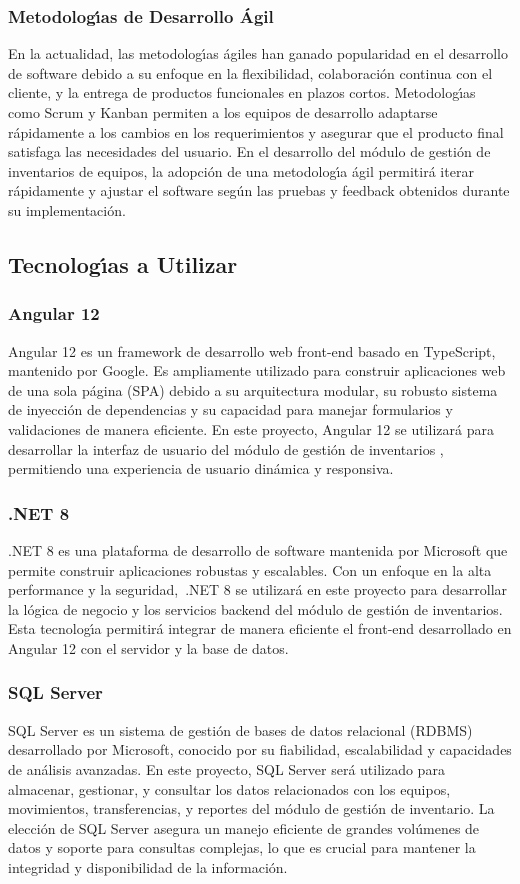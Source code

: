 \documentclass[stu, 12pt, letterpaper, donotrepeattitle, floatsintext, natbib]{apa7}
\begin{document}
\subsubsection{Metodolog\'{\i}as de Desarrollo \'Agil}
En la actualidad, las metodolog\'{\i}as \'agiles han ganado popularidad en el desarrollo de software debido a su enfoque en la flexibilidad, colaboraci\'on continua con el cliente, y la entrega de productos funcionales en plazos cortos.
Metodolog\'{\i}as como Scrum y Kanban permiten a los equipos de desarrollo adaptarse r\'apidamente a los cambios en los requerimientos y asegurar que el producto final satisfaga las necesidades del usuario. En el desarrollo del m\'odulo
de gesti\'on de inventarios de equipos, la adopci\'on de una metodolog\'{\i}a \'agil permitir\'a iterar r\'apidamente y ajustar el software seg\'un las pruebas y feedback obtenidos durante su implementaci\'on.
\subsection{Tecnolog\'{\i}as a Utilizar}
\subsubsection{Angular 12}
Angular 12 es un framework de desarrollo web front-end basado en TypeScript, mantenido por Google. Es ampliamente utilizado para construir aplicaciones web de una sola p\'agina (SPA) debido a su arquitectura modular, su robusto
sistema de inyecci\'on de dependencias y su capacidad para manejar formularios y validaciones de manera eficiente. En este proyecto, Angular 12 se utilizar\'a para desarrollar la interfaz de usuario del m\'odulo de gesti\'on de inventarios
, permitiendo una experiencia de usuario din\'amica y responsiva.
\subsubsection{.NET 8}
.NET 8 es una plataforma de desarrollo de software mantenida por Microsoft que permite construir aplicaciones robustas y escalables. Con un enfoque en la alta performance y la seguridad,~.NET 8 se utilizar\'a en este proyecto para
desarrollar la l\'ogica de negocio y los servicios backend del m\'odulo de gesti\'on de inventarios. Esta tecnolog\'{\i}a permitir\'a integrar de manera eficiente el front-end desarrollado en Angular 12 con el servidor y la base de datos.
\subsubsection{SQL Server}
SQL Server es un sistema de gesti\'on de bases de datos relacional (RDBMS) desarrollado por Microsoft, conocido por su fiabilidad, escalabilidad y capacidades de an\'alisis avanzadas. En este proyecto, SQL Server ser\'a utilizado para
almacenar, gestionar, y consultar los datos relacionados con los equipos, movimientos, transferencias, y reportes del m\'odulo de gesti\'on de inventario. La elecci\'on de SQL Server asegura un manejo eficiente de grandes vol\'umenes
de datos y soporte para consultas complejas, lo que es crucial para mantener la integridad y disponibilidad de la informaci\'on.
\end{document}
